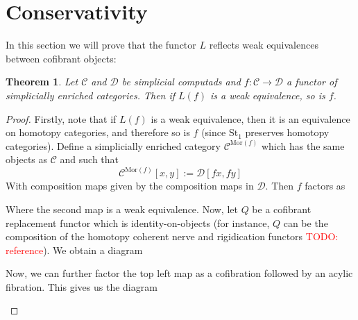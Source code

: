 \documentclass[12pt]{article}
\newtheorem{theorem}{Theorem}[section]
\theoremstyle{definition}
\newcommand{\TODO}[1]{\textcolor{red}{TODO: {#1}}}
\newcommand{\C}{\mathcal{C}}
\newcommand{\D}{\mathcal{D}}
\begin{document}
	\section{Conservativity}
	In this section we will prove that the functor $L$ reflects weak equivalences between cofibrant objects:
	\begin{theorem}
		Let $\C$ and $\D$ be simplicial computads and $f: \C \to \D$ a functor of simplicially enriched categories. Then if $L(f)$ is a weak equivalence, so is $f$. 
	\end{theorem}
	\begin{proof}
		Firstly, note that if $L(f)$ is a weak equivalence, then it is an equivalence on homotopy categories, and therefore so is $f$ (since $\text{St}_1$ preserves homotopy categories). 
		Define a simplicially enriched category $\C^{\text{Mor}(f)}$ which has the same objects as $\C$ and such that 
		$$\C^{\text{Mor}(f)}[x,y] := \D[fx,fy]$$
		With composition maps given by the composition maps in $\D$. Then $f$ factors as 
		\begin{center}
		\end{center}
		Where the second map is a weak equivalence. Now, let $Q$ be a cofibrant replacement functor which is identity-on-objects (for instance, $Q$ can be the composition of the homotopy coherent nerve and rigidication functors \TODO{reference}). We obtain a diagram
		\begin{center}
		\end{center}
		Now, we can further factor the top left map as a cofibration followed by an acylic fibration. This gives us the diagram
		\begin{center}
		\end{center}

\end{proof}
\end{document}
